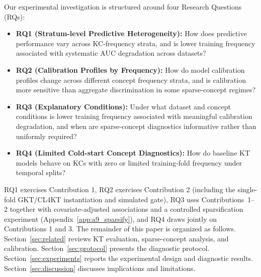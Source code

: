 Our experimental investigation is structured around four Research Questions (RQs):
\begin{itemize}
    \item \textbf{RQ1 (Stratum-level Predictive Heterogeneity):} How does predictive performance vary across KC-frequency strata, and is lower training frequency associated with systematic AUC degradation across datasets?
    \item \textbf{RQ2 (Calibration Profiles by Frequency):} How do model calibration profiles change across different concept frequency strata, and is calibration more sensitive than aggregate discrimination in some sparse-concept regimes?
    \item \textbf{RQ3 (Explanatory Conditions):} Under what dataset and concept conditions is lower training frequency associated with meaningful calibration degradation, and when are sparse-concept diagnostics informative rather than uniformly required?
    \item \textbf{RQ4 (Limited Cold-start Concept Diagnostics):} How do baseline KT models behave on KCs with zero or limited training-fold frequency under temporal splits?
\end{itemize}

RQ1 exercises Contribution 1, RQ2 exercises Contribution 2 (including the single-fold GKT/CL4KT instantiation and simulated gate), RQ3 uses Contributions~1--2 together with covariate-adjusted associations and a controlled sparsification experiment (Appendix~\ref{app:a9_sparsify}), and RQ4 draws jointly on Contributions 1 and 3. The remainder of this paper is organized as follows. Section~\ref{sec:related} reviews KT evaluation, sparse-concept analysis, and calibration. Section~\ref{sec:protocol} presents the diagnostic protocol. Section~\ref{sec:experiments} reports the experimental design and diagnostic results. Section~\ref{sec:discussion} discusses implications and limitations.
